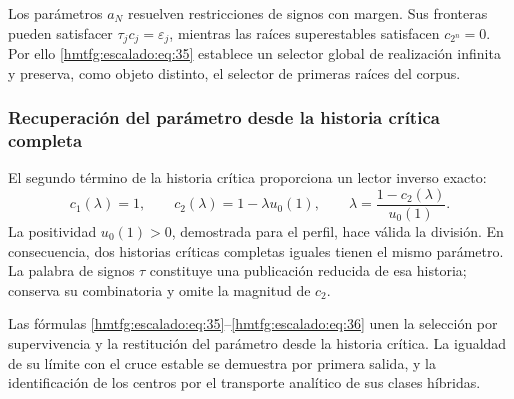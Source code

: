 Los parámetros \(a_N\) resuelven restricciones de signos con margen. Sus fronteras pueden satisfacer \(\tau_jc_j=\varepsilon_j\), mientras las raíces superestables satisfacen \(c_{2^n}=0\). Por ello \eqref{hmtfg:escalado:eq:35} establece un selector global de realización infinita y preserva, como objeto distinto, el selector de primeras raíces del corpus.

\subsubsection{Recuperación del parámetro desde la historia crítica completa}
\label{hmtfg:escalado:13.7}

El segundo término de la historia crítica proporciona un lector inverso exacto:
\begin{equation}
c_1(\lambda)=1,\qquad
c_2(\lambda)=1-\lambda u_0(1),\qquad
\boxed{\lambda=\frac{1-c_2(\lambda)}{u_0(1)}.}
\label{hmtfg:escalado:eq:36}
\end{equation}
La positividad \(u_0(1)>0\), demostrada para el perfil, hace válida la división. En consecuencia, dos historias críticas completas iguales tienen el mismo parámetro. La palabra de signos \(\tau\) constituye una publicación reducida de esa historia; conserva su combinatoria y omite la magnitud de \(c_2\).

Las fórmulas \eqref{hmtfg:escalado:eq:35}–\eqref{hmtfg:escalado:eq:36} unen la selección por supervivencia y la restitución del parámetro desde la historia crítica. La igualdad de su límite con el cruce estable se demuestra por primera salida, y la identificación de los centros por el transporte analítico de sus clases híbridas.
